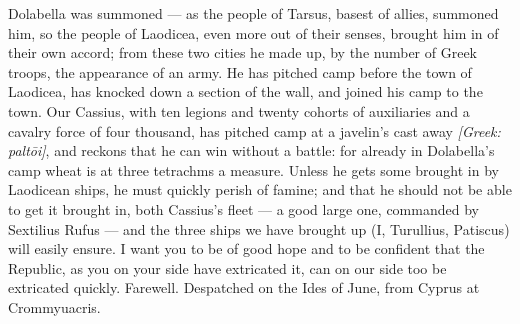  Dolabella was summoned --- as the people of Tarsus, basest of allies, summoned him, so the people of Laodicea, even more out of their senses, brought him in of their own accord; from these two cities he made up, by the number of Greek troops, the appearance of an army. He has pitched camp before the town of Laodicea, has knocked down a section of the wall, and joined his camp to the town. Our Cassius, with ten legions and twenty cohorts of auxiliaries and a cavalry force of four thousand, has pitched camp at a javelin's cast away \textit{[Greek: paltōi]}, and reckons that he can win without a battle: for already in Dolabella's camp wheat is at three tetrachms a measure. Unless he gets some brought in by Laodicean ships, he must quickly perish of famine; and that he should not be able to get it brought in, both Cassius's fleet --- a good large one, commanded by Sextilius Rufus --- and the three ships we have brought up (I, Turullius, Patiscus) will easily ensure. I want you to be of good hope and to be confident that the Republic, as you on your side have extricated it, can on our side too be extricated quickly. Farewell. Despatched on the Ides of June, from Cyprus at Crommyuacris.
